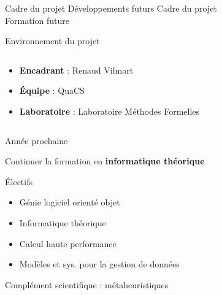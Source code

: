 \documentclass[french, 12pt]{beamer}
\begin{document}
\begin{frame}{Cadre du projet Développements futurs}
    \huge{Cadre du projet \\ Formation future}
\end{frame}

\begin{frame}{Environnement du projet}
    \begin{columns}
        \begin{column}{0.6\textwidth}
            \begin{itemize}
                \item \textbf{Encadrant} : Renaud Vilmart
                \item \textbf{Équipe} : QuaCS
                \item \textbf{Laboratoire} : Laboratoire Méthodes Formelles
            \end{itemize}
        \end{column}
        \begin{column}{0.4\textwidth}
            \begin{center}
                
                \vspace{0.5cm}
                
            \end{center}
        \end{column}
    \end{columns}
\end{frame}

\begin{frame}{Année prochaine}
\begin{center}
    Continuer la formation en \textbf{informatique théorique}
\end{center}
\small{Électifs} %
\footnotesize{
\begin{itemize}
    \item Génie logiciel orienté objet
    \item Informatique théorique
    \item Calcul haute performance
    \item Modèles et sys. pour la gestion de données
\end{itemize}}
\vspace{1em}
\small{Complément scientifique : métaheuristiques}
\end{frame}
\end{document}
